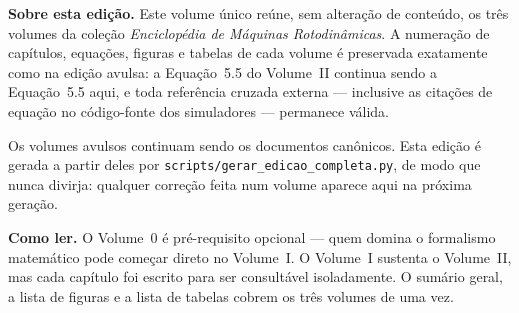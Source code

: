 \newpage
\thispagestyle{empty}
\vspace*{\fill}
\begin{center}
	\begin{minipage}{0.78\textwidth}
		\small
		\textbf{Sobre esta edição.} Este volume único reúne, sem alteração de
		conteúdo, os três volumes da coleção \emph{Enciclopédia de Máquinas
		Rotodinâmicas}. A numeração de capítulos, equações, figuras e tabelas de
		cada volume é preservada exatamente como na edição avulsa: a
		Equação~5.5 do Volume~II continua sendo a Equação~5.5 aqui, e toda
		referência cruzada externa --- inclusive as citações de equação no
		código-fonte dos simuladores --- permanece válida.

		\vspace{0.8em}
		Os volumes avulsos continuam sendo os documentos canônicos. Esta edição
		é gerada a partir deles por
		\texttt{scripts/gerar\_edicao\_completa.py}, de modo que nunca divirja:
		qualquer correção feita num volume aparece aqui na próxima geração.

		\vspace{0.8em}
		\textbf{Como ler.} O Volume~0 é pré-requisito opcional --- quem domina o
		formalismo matemático pode começar direto no Volume~I. O Volume~I
		sustenta o Volume~II, mas cada capítulo foi escrito para ser consultável
		isoladamente. O sumário geral, a lista de figuras e a lista de tabelas
		cobrem os três volumes de uma vez.
	\end{minipage}
\end{center}
\vspace*{\fill}
